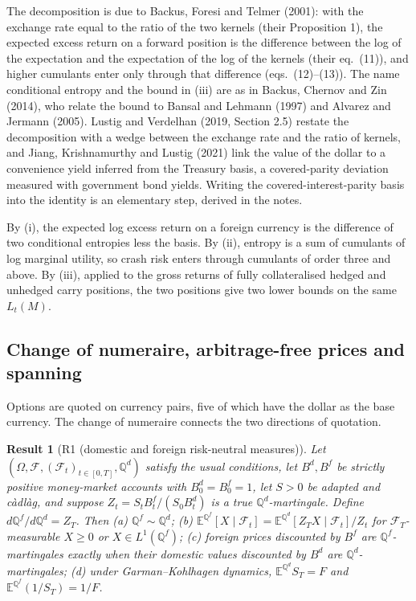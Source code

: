 \documentclass[11pt]{article}
\theoremstyle{result}
\newtheorem*{result}{Result}
\newcommand{\E}{\mathbb{E}}
\newcommand{\Q}{\mathbb{Q}}
\begin{document}
The decomposition is due to Backus, Foresi and Telmer (2001): with the exchange rate equal to the ratio of the two kernels (their Proposition 1), the expected excess return on a forward position is the difference between the log of the expectation and the expectation of the log of the kernels (their eq.~(11)), and higher cumulants enter only through that difference (eqs.~(12)--(13)). The name conditional entropy and the bound in (iii) are as in Backus, Chernov and Zin (2014), who relate the bound to Bansal and Lehmann (1997) and Alvarez and Jermann (2005). Lustig and Verdelhan (2019, Section 2.5) restate the decomposition with a wedge between the exchange rate and the ratio of kernels, and Jiang, Krishnamurthy and Lustig (2021) link the value of the dollar to a convenience yield inferred from the Treasury basis, a covered-parity deviation measured with government bond yields. Writing the covered-interest-parity basis into the identity is an elementary step, derived in the notes.

By (i), the expected log excess return on a foreign currency is the difference of two conditional entropies less the basis. By (ii), entropy is a sum of cumulants of log marginal utility, so crash risk enters through cumulants of order three and above. By (iii), applied to the gross returns of fully collateralised hedged and unhedged carry positions, the two positions give two lower bounds on the same $L_t(M)$.

\subsection{Change of numeraire, arbitrage-free prices and spanning}

Options are quoted on currency pairs, five of which have the dollar as the base currency. The change of numeraire connects the two directions of quotation.

\begin{result}[R1 (domestic and foreign risk-neutral measures)]
Let $(\Omega,\mathcal F,(\mathcal F_t)_{t\in[0,T]},\Q^d)$ satisfy the usual conditions, let $B^d,B^f$ be strictly positive money-market accounts with $B^d_0=B^f_0=1$, let $S>0$ be adapted and c\`adl\`ag, and suppose $Z_t=S_tB^f_t/(S_0B^d_t)$ is a true $\Q^d$-martingale. Define $d\Q^f/d\Q^d=Z_T$. Then (a) $\Q^f\sim\Q^d$; (b) $\E^{\Q^f}[X\mid\mathcal F_t]=\E^{\Q^d}[Z_TX\mid\mathcal F_t]/Z_t$ for $\mathcal F_T$-measurable $X\ge0$ or $X\in L^1(\Q^f)$; (c) foreign prices discounted by $B^f$ are $\Q^f$-martingales exactly when their domestic values discounted by $B^d$ are $\Q^d$-martingales; (d) under Garman--Kohlhagen dynamics, $\E^{\Q^d}S_T=F$ and $\E^{\Q^f}(1/S_T)=1/F$.
\end{result}
\end{document}
